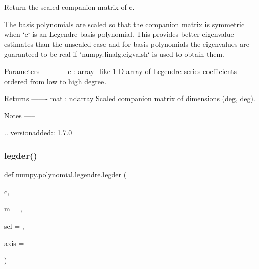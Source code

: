 \begin{DoxyVerb}Return the scaled companion matrix of c.

The basis polynomials are scaled so that the companion matrix is
symmetric when `c` is an Legendre basis polynomial. This provides
better eigenvalue estimates than the unscaled case and for basis
polynomials the eigenvalues are guaranteed to be real if
`numpy.linalg.eigvalsh` is used to obtain them.

Parameters
----------
c : array_like
    1-D array of Legendre series coefficients ordered from low to high
    degree.

Returns
-------
mat : ndarray
    Scaled companion matrix of dimensions (deg, deg).

Notes
-----

.. versionadded:: 1.7.0\end{DoxyVerb}
 \mbox{\label{namespacenumpy_1_1polynomial_1_1legendre_a7697098873adb1e5099f375a6b81ae4f}} 
\subsubsection{\texorpdfstring{legder()}{legder()}}
{\footnotesize\ttfamily def numpy.\+polynomial.\+legendre.\+legder (\begin{DoxyParamCaption}\item[{}]{c,  }\item[{}]{m = {},  }\item[{}]{scl = {},  }\item[{}]{axis = {} }\end{DoxyParamCaption})}

